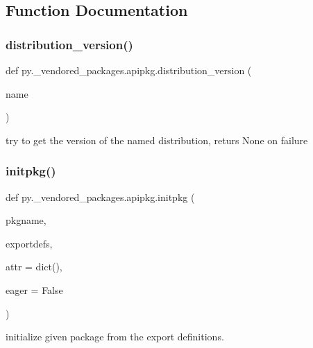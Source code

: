 \subsection{Function Documentation}
\mbox{\label{namespacepy_1_1__vendored__packages_1_1apipkg_a7a1ecd8854faed466c7412d6b83d57f6}} 
\subsubsection{\texorpdfstring{distribution\+\_\+version()}{distribution\_version()}}
{\footnotesize\ttfamily def py.\+\_\+vendored\+\_\+packages.\+apipkg.\+distribution\+\_\+version (\begin{DoxyParamCaption}\item[{}]{name }\end{DoxyParamCaption})}

\begin{DoxyVerb}try to get the version of the named distribution,
returs None on failure\end{DoxyVerb}
 \mbox{\label{namespacepy_1_1__vendored__packages_1_1apipkg_a59a3bd733b536fe5a9c339248f046b34}} 
\subsubsection{\texorpdfstring{initpkg()}{initpkg()}}
{\footnotesize\ttfamily def py.\+\_\+vendored\+\_\+packages.\+apipkg.\+initpkg (\begin{DoxyParamCaption}\item[{}]{pkgname,  }\item[{}]{exportdefs,  }\item[{}]{attr = {\ttfamily dict()},  }\item[{}]{eager = {\ttfamily False} }\end{DoxyParamCaption})}

\begin{DoxyVerb}initialize given package from the export definitions. \end{DoxyVerb}
 